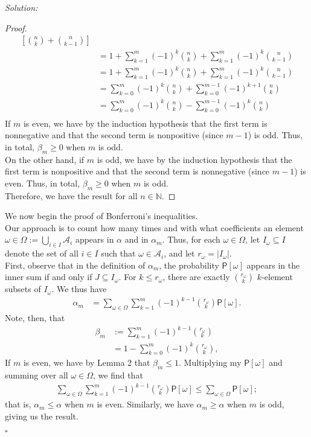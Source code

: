 \documentclass[12pt]{article}
\newcommand{\NN}{\mathbb{N}}
\newcommand{\A}{\mathcal{A}}
\newcommand{\prob}{\mathsf{P}}
\newcommand{\pr}[1]{\prob\left[#1\right]}
\newenvironment{sol}
    {\emph{Solution:}
    }
    {
    $\square$
    }
\begin{document}
\begin{sol}
\begin{proof}
\begin{align*}
            \left[ \binom{n}{k} + \binom{n}{k-1} \right] \\
            &= 1 + \sum_{k=1}^m (-1)^k  \binom{n}{k}
            + \sum_{k=1}^m (-1)^k \binom{n}{k-1} \\
            &= 1 + \sum_{k=1}^m (-1)^k  \binom{n}{k}
            + \sum_{k=1}^m (-1)^k \binom{n}{k-1} \\
            &= \sum_{k=0}^m (-1)^k  \binom{n}{k}
            + \sum_{k=0}^{m-1} (-1)^{k+1} \binom{n}{k} \\
            &= \sum_{k=0}^m (-1)^k  \binom{n}{k}
            - \sum_{k=0}^{m-1} (-1)^{k} \binom{n}{k} \\
        \end{align*}
        \indent If $m$ is even, we have by the induction hypothesis that the first term is nonnegative and that the second term is nonpositive (since $m-1$) is odd. Thus, in total, $\beta_m \geq 0$ when $m$ is odd. \\
        \indent On the other hand, if $m$ is odd, we have by the induction hypothesis that the first term is nonpositive and that the second term is nonnegative (since $m-1$) is even. Thus, in total, $\beta_m \geq 0$ when $m$ is odd. \\
        \indent Therefore, we have the result for all $n\in\NN$.
    \end{proof}
    \indent We now begin the proof of Bonferroni's inequalities. \\
    \indent Our approach is to count how many times and with what coefficients an element \\$\omega\in\Omega := \bigcup_{i\in I} \A_i$ appears in $\alpha$ and in $\alpha_m$. Thus, for each $\omega\in\Omega$, let $I_\omega\subseteq I$ denote the set of all $i\in I$ such that $\omega\in \A_i$, and let $r_\omega = |I_\omega|$. \\
    \indent First, observe that in the definition of $\alpha_m$, the probability $\pr{\omega}$ appears in the inner sum if and only if $J\subseteq I_\omega$. For $k\leq r_\omega$, there are exactly $\binom{r_\omega}{k}$ $k$-element subsets of $I_\omega$. We thus have
    \begin{align*}
        \alpha_m &= \sum_{\omega\in\Omega}\sum_{k=1}^{m} (-1)^{k-1} \binom{r_\omega}{k} \pr{\omega}.
    \end{align*}
    Note, then, that
    \begin{align*}
        \beta_m &:= \sum_{k=1}^m (-1)^{k-1} \binom{r_\omega}{k} \\
        &= 1 - \sum_{k=0}^m (-1)^{k} \binom{r_\omega}{k},
    \end{align*}
    If $m$ is even, we have by Lemma 2 that $\beta_m \leq 1$. Multiplying my $\pr{\omega}$ and summing over all $\omega\in\Omega$, we find that
    \begin{align*}
        \sum_{\omega\in\Omega} \sum_{k=1}^m (-1)^{k-1} \binom{r_\omega}{k}\pr{\omega} \leq \sum_{\omega\in\Omega} \pr{\omega};
    \end{align*}
    that is, $\alpha_m \leq \alpha$ when $m$ is even. Similarly, we have $\alpha_m\geq \alpha$ when $m$ is odd, giving us the result.
    \end{sol}
\end{document}
